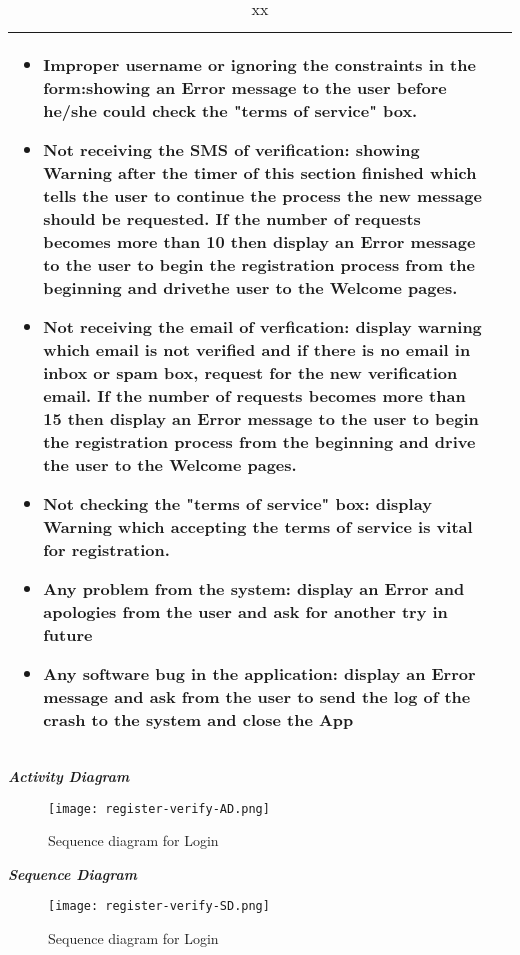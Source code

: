 \begin{table}[!hbtp]
\begin{tabulary}{\textwidth}{|J|J|}
\begin{minipage}[t]{0.8\textwidth}
\begin{itemize}
\item Improper username or ignoring the constraints in the form:showing an Error message to the user before he/she could check the "terms of service" box.
\item Not receiving the SMS of verification: showing Warning after the timer of this section finished which tells the user to continue the process the new message should be requested. If the number of requests becomes more than 10 then display an Error message to the user to begin the registration process from the beginning and drivethe user to the Welcome pages.
\item Not receiving the email of verfication: display warning which email is not verified and if there is no email in inbox or spam box, request for the new verification email. If the number of requests becomes more than 15 then display an Error message to the user to begin the registration process from the beginning and drive the user to the Welcome pages.
\item Not checking the "terms of service" box: display Warning which accepting the terms of service is vital for registration.
\item Any problem from the system: display an Error and apologies from the user and ask for another try in future
\item Any software bug in the application: display an Error message and ask from the user to send the log of the crash to the system and close the App
\end{itemize}
\end{minipage}\\
\hline
\end{tabulary}
\caption{\label{tab:xx}xx}
\end{table}

\emph{\textbf{Activity Diagram}}

\begin{figure}[H]
\caption{Sequence diagram for Login}
\label{fig:SD-login}
\centering
\texttt{[image: register-verify-AD.png]}
\end{figure}

\emph{\textbf{Sequence Diagram}}

\begin{figure}[H]
\caption{Sequence diagram for Login}
\label{fig:SD-login}
\centering
\texttt{[image: register-verify-SD.png]}
\end{figure}

